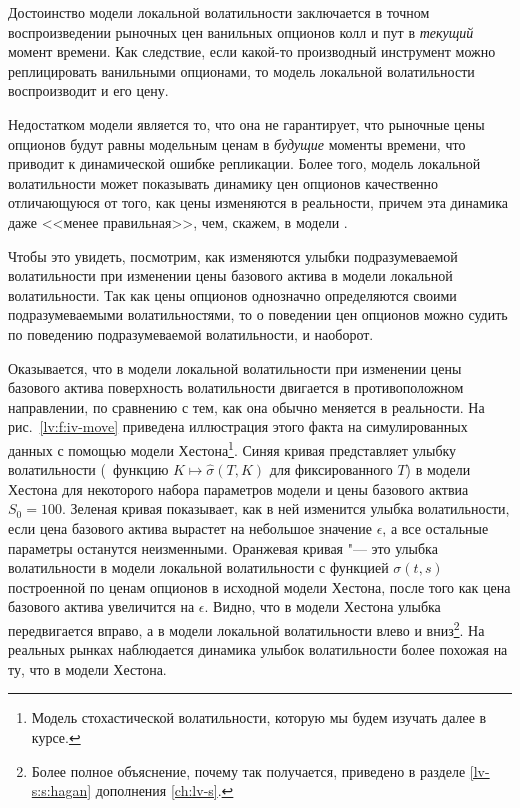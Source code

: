 Достоинство модели локальной волатильности заключается в точном воспроизведении рыночных цен ванильных опционов колл и пут в \emph{текущий} момент времени.
Как следствие, если какой-то производный инструмент можно реплицировать ванильными опционами, то модель локальной волатильности воспроизводит и его цену.

Недостатком модели является то, что она не гарантирует, что рыночные цены опционов будут равны модельным ценам в \emph{будущие} моменты времени,
что приводит к динамической ошибке репликации.
Более того, модель локальной волатильности может показывать динамику цен опционов качественно отличающуюся от того, как цены изменяются в реальности, причем эта динамика даже <<менее правильная>>, чем, скажем, в модели \bs.

Чтобы это увидеть, посмотрим, как изменяются улыбки подразумеваемой волатильности при изменении цены базового актива в модели локальной волатильности. Так как цены опционов однозначно определяются своими подразумеваемыми волатильностями, то о поведении цен опционов можно судить по поведению подразумеваемой волатильности, и наоборот.

Оказывается, что в модели локальной волатильности при изменении цены базового актива поверхность волатильности двигается в противоположном направлении, по сравнению с тем, как она обычно меняется в реальности.
На рис.~\ref{lv:f:iv-move} приведена иллюстрация этого факта на симулированных данных с помощью модели Хестона\footnote{Модель стохастической волатильности, которую мы будем изучать далее в курсе.}.
Синяя кривая представляет улыбку волатильности (\te\ функцию $K\mapsto\hat\sigma(T,K)$ для фиксированного $T$) в модели Хестона для некоторого набора параметров модели и цены базового актвиа $S_0=100$.
Зеленая кривая показывает, как в ней изменится улыбка волатильности, если цена базового актива вырастет на небольшое значение $\epsilon$, а все остальные параметры останутся неизменными.
Оранжевая кривая "--- это улыбка волатильности в модели локальной волатильности с функцией $\sigma(t,s)$ построенной по ценам опционов в исходной модели Хестона, после того как цена базового актива увеличится на $\epsilon$.
Видно, что в модели Хестона улыбка передвигается вправо, а в модели локальной волатильности влево и вниз\footnote{Более полное объяснение, почему так получается, приведено в разделе \ref{lv-s:s:hagan} дополнения \ref{ch:lv-s}.}.
На реальных рынках наблюдается динамика улыбок волатильности более похожая на ту, что в модели Хестона.


